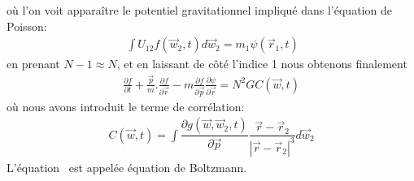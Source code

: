 où l'on voit apparaître le potentiel gravitationnel impliqué dans l'équation de Poisson:
\begin{align*}
	\displaystyle{\ \int U_{12}f\left(  \vec{w}_{2},t\right)  d\vec{w}_{2}=m_{1}\psi\left(  \vec{r}_{1},t\right)  }%
\end{align*}
en prenant $N-1\approx N$, et en laissant de côté l'indice 1 nous obtenons finalement
\begin{align}
	\frac{\partial f}{\partial t}+\frac{\vec{p}}{m}.\frac{\partial f}{\partial\vec{r}}-m\frac{\partial f}{\partial\vec{p}}\frac{\partial\psi
	}{\partial\vec{r}}=N^{2}GC\left(  \vec{w},t\right)  \label{boltzman}%
\end{align}
où nous avons introduit le terme de corrélation:
\begin{align*}
	C\left(  \vec{w},t\right)  =\displaystyle\int\dfrac{\partial g\left(\vec{w},\vec{w}_{2},t\right)  }{\partial\vec{p}}\dfrac{\vec{r}%
	-\vec{r}_{2}}{\left\vert \vec{r}-\vec{r}_{2}\right\vert ^{3}}d\vec{w}_{2}%
\end{align*}
L'équation~ est appelée équation de Boltzmann.

